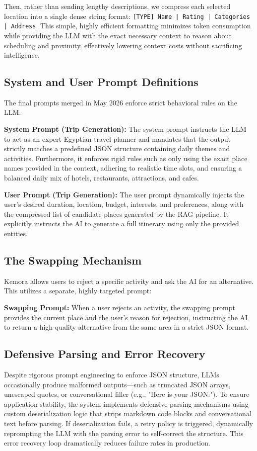 Then, rather than sending lengthy descriptions, we compress each selected location into a single dense string format: \texttt{[TYPE] Name | Rating | Categories | Address}. This simple, highly efficient formatting minimizes token consumption while providing the LLM with the exact necessary context to reason about scheduling and proximity, effectively lowering context costs without sacrificing intelligence.

\subsection{System and User Prompt Definitions}
The final prompts merged in May 2026 enforce strict behavioral rules on the LLM.

\textbf{System Prompt (Trip Generation):}
The system prompt instructs the LLM to act as an expert Egyptian travel planner and mandates that the output strictly matches a predefined JSON structure containing daily themes and activities. Furthermore, it enforces rigid rules such as only using the exact place names provided in the context, adhering to realistic time slots, and ensuring a balanced daily mix of hotels, restaurants, attractions, and cafes.

\textbf{User Prompt (Trip Generation):}
The user prompt dynamically injects the user's desired duration, location, budget, interests, and preferences, along with the compressed list of candidate places generated by the RAG pipeline. It explicitly instructs the AI to generate a full itinerary using only the provided entities.

\subsection{The Swapping Mechanism}
Kemora allows users to reject a specific activity and ask the AI for an alternative. This utilizes a separate, highly targeted prompt:

\textbf{Swapping Prompt:}
When a user rejects an activity, the swapping prompt provides the current place and the user's reason for rejection, instructing the AI to return a high-quality alternative from the same area in a strict JSON format.

\subsection{Defensive Parsing and Error Recovery}
Despite rigorous prompt engineering to enforce JSON structure, LLMs occasionally produce malformed outputs---such as truncated JSON arrays, unescaped quotes, or conversational filler (e.g., "Here is your JSON:"). To ensure application stability, the system implements defensive parsing mechanisms using custom deserialization logic that strips markdown code blocks and conversational text before parsing. If deserialization fails, a retry policy is triggered, dynamically reprompting the LLM with the parsing error to self-correct the structure. This error recovery loop dramatically reduces failure rates in production.

